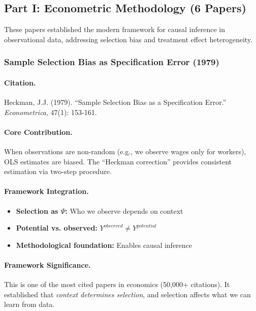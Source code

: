 \documentclass[12pt,a4paper]{article}
\begin{document}
\subsection{Part I: Econometric Methodology (6 Papers)}

These papers established the modern framework for causal inference in
observational data, addressing selection bias and treatment effect heterogeneity.

\subsubsection{Sample Selection Bias as Specification Error (1979)}

\paragraph{Citation.}
Heckman, J.J. (1979). ``Sample Selection Bias as a Specification Error.''
\emph{Econometrica}, 47(1): 153-161.

\paragraph{Core Contribution.}
When observations are non-random (e.g., we observe wages only for workers),
OLS estimates are biased. The ``Heckman correction'' provides consistent
estimation via two-step procedure.

\paragraph{Framework Integration.}
\begin{itemize}
  \item \textbf{Selection as $\Psi$:} Who we observe depends on context
  \item \textbf{Potential vs. observed:} $Y^{observed} \neq Y^{potential}$
  \item \textbf{Methodological foundation:} Enables causal inference
\end{itemize}

\paragraph{Framework Significance.}
This is one of the most cited papers in economics (50,000+ citations).
It established that \emph{context determines selection}, and selection
affects what we can learn from data.

\end{document}
